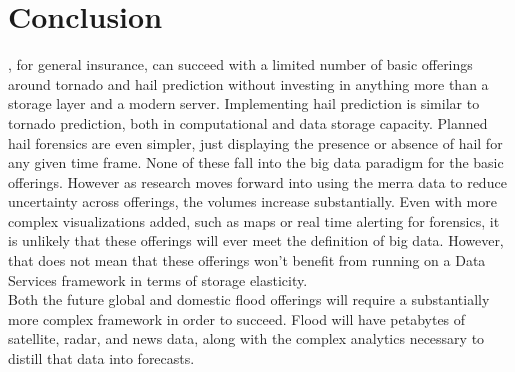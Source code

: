 \section{Conclusion}
\climatedge, for general insurance, can succeed with a limited number of basic offerings around tornado and hail prediction without investing in anything more than a storage layer and a modern server. Implementing hail prediction is similar to tornado prediction, both in computational and data storage capacity. Planned hail forensics are even simpler, just displaying the presence or absence of hail for any given time frame. None of these fall into the big data paradigm for the basic offerings. However as research moves forward into using the \gls{merra} data to reduce uncertainty across offerings, the volumes increase substantially. Even with more complex visualizations added, such as maps or real time alerting for forensics, it is unlikely that these offerings will ever meet the definition of big data. However, that does not mean that these offerings won't benefit from running on a Data Services framework in terms of storage elasticity. \\

Both the future global and domestic flood offerings will require a substantially more complex framework in order to succeed. Flood will have petabytes of satellite, radar, and news data, along with the complex analytics necessary to distill that data into forecasts.  